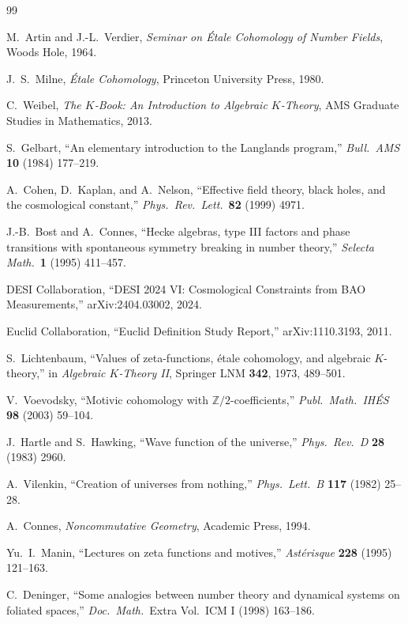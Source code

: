 \documentclass[12pt,a4paper]{article}
\theoremstyle{definition}
\newcommand{\Z}{\mathbb{Z}}
\begin{document}
\begin{thebibliography}{99}

M.~Artin and J.-L.~Verdier, \textit{Seminar on \'Etale Cohomology of Number Fields},
Woods Hole, 1964.

J.~S.~Milne, \textit{\'Etale Cohomology}, Princeton University Press, 1980.

C.~Weibel, \textit{The $K$-Book: An Introduction to Algebraic $K$-Theory},
AMS Graduate Studies in Mathematics, 2013.

S.~Gelbart, ``An elementary introduction to the Langlands program,''
\textit{Bull.\ AMS} \textbf{10} (1984) 177--219.

A.~Cohen, D.~Kaplan, and A.~Nelson,
``Effective field theory, black holes, and the cosmological constant,''
\textit{Phys.\ Rev.\ Lett.}\ \textbf{82} (1999) 4971.

J.-B.~Bost and A.~Connes,
``Hecke algebras, type III factors and phase transitions with spontaneous symmetry breaking
in number theory,''
\textit{Selecta Math.}\ \textbf{1} (1995) 411--457.

DESI Collaboration, ``DESI 2024 VI: Cosmological Constraints from BAO Measurements,''
arXiv:2404.03002, 2024.

Euclid Collaboration, ``Euclid Definition Study Report,''
arXiv:1110.3193, 2011.

S.~Lichtenbaum, ``Values of zeta-functions, \'etale cohomology, and algebraic $K$-theory,''
in \textit{Algebraic $K$-Theory II}, Springer LNM \textbf{342}, 1973, 489--501.

V.~Voevodsky, ``Motivic cohomology with $\Z/2$-coefficients,''
\textit{Publ.\ Math.\ IH\'ES} \textbf{98} (2003) 59--104.

J.~Hartle and S.~Hawking,
``Wave function of the universe,''
\textit{Phys.\ Rev.\ D} \textbf{28} (1983) 2960.

A.~Vilenkin, ``Creation of universes from nothing,''
\textit{Phys.\ Lett.\ B} \textbf{117} (1982) 25--28.

A.~Connes, \textit{Noncommutative Geometry}, Academic Press, 1994.

Yu.~I.~Manin, ``Lectures on zeta functions and motives,''
\textit{Ast\'erisque} \textbf{228} (1995) 121--163.

C.~Deninger, ``Some analogies between number theory and dynamical systems on foliated spaces,''
\textit{Doc.\ Math.}\ Extra Vol.\ ICM I (1998) 163--186.


\end{thebibliography}
\end{document}
